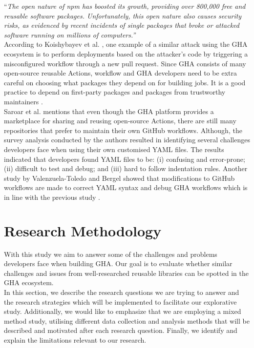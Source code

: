 \documentclass[conference]{IEEEtran}
\begin{document}
        “\textit{The open nature of npm has boosted its growth, providing over 800,000 free and reusable software packages. Unfortunately, this open nature also causes security risks, as evidenced by recent incidents of single packages that broke or attacked software running on millions of computers.”} \\

        According to Koishybayev et al. \cite{koishybayev2022characterizing}, one example of a similar attack using the GHA ecosystem is to perform deployments based on the attacker’s code by triggering a misconfigured workflow through a new pull request. Since GHA consists of many open-source reusable Actions, workflow and GHA developers need to be extra careful on choosing what packages they depend on for building jobs. It is a good practice to depend on first-party packages and packages from trustworthy maintainers \cite{zimmermann2019small}. \\

        Saroar et al. \cite{saroar2023developers} mentions that even though the GHA platform provides a marketplace for sharing and reusing open-source Actions, there are still many repositories that prefer to maintain their own GitHub workflows. Although, the survey analysis conducted by the authors resulted in identifying several challenges developers face when using their own customised YAML files.  The results indicated that developers found YAML files to be: (i) confusing and error-prone; (ii) difficult to test and debug; and (iii) hard to follow indentation rules. Another study by Valenzuela-Toledo and Bergel \cite{valenzuela2022evolution}  showed that modifications to GitHub workflows are made to correct YAML syntax and debug GHA workflows which is in line with the previous study \cite{saroar2023developers}.



\section{Research Methodology}
    With this study we aim to answer some of the challenges and problems developers face when building GHA. Our goal is to evaluate whether similar challenges and issues from well-researched reusable libraries can be spotted in the GHA ecosystem.\\

    In this section, we describe the research questions we are trying to answer and the research strategies which will be implemented to facilitate our explorative study. Additionally, we would like to emphasize that we are employing a mixed method study, utilising different data collection and analysis methods that will be described and motivated after each research question. Finally, we identify and explain the limitations relevant to our research.
\end{document}
